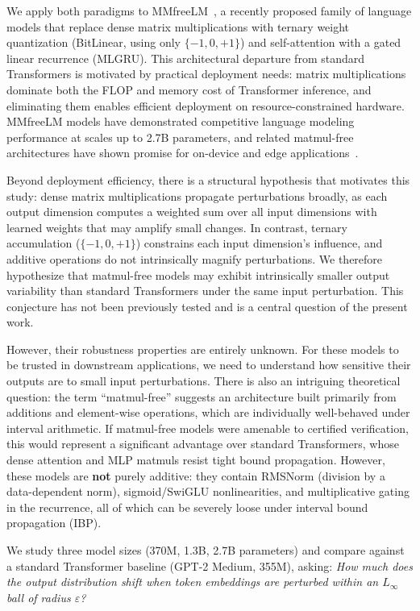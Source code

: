 \documentclass[11pt]{article}
\begin{document}
We apply both paradigms to MMfreeLM~\cite{zhu2024scalable}, a recently proposed family of language models that replace dense matrix multiplications with ternary weight quantization (BitLinear, using only $\{-1, 0, +1\}$) and self-attention with a gated linear recurrence (MLGRU). This architectural departure from standard Transformers is motivated by practical deployment needs: matrix multiplications dominate both the FLOP and memory cost of Transformer inference, and eliminating them enables efficient deployment on resource-constrained hardware. MMfreeLM models have demonstrated competitive language modeling performance at scales up to 2.7B parameters, and related matmul-free architectures have shown promise for on-device and edge applications~\cite{zhu2023spikegpt}.

Beyond deployment efficiency, there is a structural hypothesis that motivates this study: dense matrix multiplications propagate perturbations broadly, as each output dimension computes a weighted sum over all input dimensions with learned weights that may amplify small changes. In contrast, ternary accumulation ($\{-1, 0, +1\}$) constrains each input dimension's influence, and additive operations do not intrinsically magnify perturbations. We therefore hypothesize that matmul-free models may exhibit intrinsically smaller output variability than standard Transformers under the same input perturbation. This conjecture has not been previously tested and is a central question of the present work.

However, their robustness properties are entirely unknown. For these models to be trusted in downstream applications, we need to understand how sensitive their outputs are to small input perturbations. There is also an intriguing theoretical question: the term ``matmul-free'' suggests an architecture built primarily from additions and element-wise operations, which are individually well-behaved under interval arithmetic. If matmul-free models were amenable to certified verification, this would represent a significant advantage over standard Transformers, whose dense attention and MLP matmuls resist tight bound propagation. However, these models are \textbf{not} purely additive: they contain RMSNorm (division by a data-dependent norm), sigmoid/SwiGLU nonlinearities, and multiplicative gating in the recurrence, all of which can be severely loose under interval bound propagation (IBP).

We study three model sizes (370M, 1.3B, 2.7B parameters) and compare against a standard Transformer baseline (GPT-2 Medium, 355M), asking: \emph{How much does the output distribution shift when token embeddings are perturbed within an $L_\infty$ ball of radius $\varepsilon$?}
\end{document}
